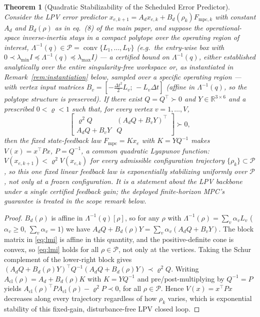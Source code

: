 \documentclass[journal]{IEEEtran}
\newtheorem{theorem}{Theorem}
\newcommand{\Laminv}{\Lambda^{-1}(q)}
\newcommand{\Fmpc}{F_{\text{mpc}}}
\newcommand{\Fmpck}[1]{F_{\text{mpc},#1}}
\begin{document}
\begin{theorem}[Quadratic Stabilizability of the Scheduled Error
Predictor]\label{thm:workspace}
Consider the LPV error predictor
$x_{e,k+1}=A_dx_{e,k}+B_d(\rho_k)\Fmpck{k}$ with constant $A_d$ and
$B_d(\rho)$ as in eq.~(8) of the main paper, and suppose the
operational-space inverse-inertia stays in a compact polytope over the
operating region of interest,
$\Laminv\in\mathcal P=\operatorname{conv}\{L_1,\dots,L_V\}$ (e.g.\ the
entry-wise box with $0\prec\lambda_{\min}I\preceq\Laminv\preceq\lambda_{\max}I$)
--- a certified bound on $\Laminv$, either established analytically over
the entire singularity-free workspace or, as instantiated in
Remark~\ref{rem:instantiation} below, sampled over a specific operating
region --- with vertex input matrices
$B_v=[-\tfrac{\Delta t^2}2L_v;\,-L_v\Delta t]$ (affine in $\Laminv$, so
the polytope structure is preserved). If there exist $Q=Q^\top\succ0$ and
$Y\in\mathbb R^{3\times6}$ and a prescribed $0<\varrho<1$ such that, for
every vertex $v=1,\dots,V$,
\begin{equation}
\begin{bmatrix}\varrho^2Q & (A_dQ+B_vY)^\top\\A_dQ+B_vY & Q\end{bmatrix}\succ0,
\label{eq:lmi}
\end{equation}
then the \emph{fixed} state-feedback law $\Fmpc=Kx_e$ with $K=YQ^{-1}$
makes $V(x)=x^\top Px$, $P=Q^{-1}$, a \emph{common} quadratic Lyapunov
function: $V(x_{e,k+1})<\varrho^2V(x_{e,k})$ for
\emph{every} admissible configuration trajectory
$\{\rho_k\}\subset\mathcal P$, so this one fixed linear feedback law is
exponentially stabilizing uniformly over $\mathcal P$, not only at a
frozen configuration. It is a statement about the LPV \emph{backbone}
under a single certified feedback gain; the deployed finite-horizon MPC's
guarantee is treated in the scope remark below.
\end{theorem}

\begin{proof}
$B_d(\rho)$ is affine in $\Laminv[\rho]$, so for any $\rho$ with
$\Lambda^{-1}(\rho)=\sum_v\alpha_vL_v$ ($\alpha_v\ge0$,
$\sum_v\alpha_v=1$) we have
$A_dQ+B_d(\rho)Y=\sum_v\alpha_v(A_dQ+B_vY)$. The block matrix in
\eqref{eq:lmi} is affine in this quantity, and the positive-definite
cone is convex, so \eqref{eq:lmi} holds for all $\rho\in\mathcal P$, not
only at the vertices. Taking the Schur complement of the lower-right
block gives
$(A_dQ+B_d(\rho)Y)^\top Q^{-1}(A_dQ+B_d(\rho)Y)\prec\varrho^2Q$.
Writing $A_\text{cl}(\rho)=A_d+B_d(\rho)K$ with $K=YQ^{-1}$ and
pre/post-multiplying by $Q^{-1}=P$ yields
$A_\text{cl}(\rho)^\top PA_\text{cl}(\rho)-\varrho^2P\prec0$, for
all $\rho\in\mathcal P$. Hence $V(x)=x^\top Px$ decreases along every
trajectory regardless of how $\rho_k$ varies, which is exponential
stability of this fixed-gain, disturbance-free LPV closed loop.
\end{proof}
\end{document}
